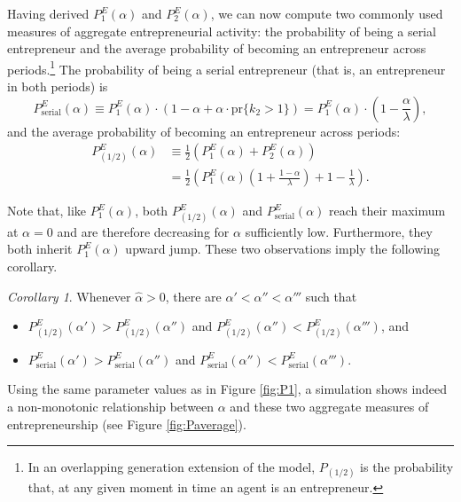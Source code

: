 \documentclass[12pt,american]{paper}
\theoremstyle{remark}
\newtheorem{cor}{Corollary}
\begin{document}
Having derived $P_1^E(\alpha)$ and $P_2^E(\alpha)$, we can now compute two commonly used measures of aggregate entrepreneurial activity: the probability of being a serial entrepreneur and the average probability of becoming an entrepreneur across periods.\footnote{In an overlapping generation extension of the model, $P_{(1/2)}$ is the probability that, at any given moment in time an agent is an entrepreneur.}
The probability of being a serial entrepreneur (that is, an entrepreneur in both periods) is
$$
P_{\mbox{serial}}^E(\alpha)\equiv P_1^E(\alpha) \cdot (1-\alpha +  \alpha \cdot \mbox{pr}\{k_2>1\})= P_1^E (\alpha)  \cdot \left(1-\frac{\alpha}{\lambda} \right),
$$
and the average probability of becoming an entrepreneur across periods:
\begin{align*}
P_{(1/2)}^E(\alpha)&\equiv \frac{1}{2} \left( P_1^E(\alpha) + P_2^E(\alpha) \right)\\
&= \frac{1}{2} \left( P_1^E(\alpha) \left(1+\frac{1-\alpha}{\lambda}\right) + 1 -\frac{1}{\lambda}  \right). 
\end{align*} 

Note that, like $ P_1^E(\alpha)$, both $P_{(1/2)}^E(\alpha)$ and $P_{\mbox{serial}}^E(\alpha)$ reach their maximum at $\alpha=0$ and are therefore decreasing for $\alpha$ sufficiently low. Furthermore, they both inherit $ P_1^E(\alpha)$ upward jump. These two observations imply the following corollary.


\begin{cor}\label{prop:probability-of-entrepreneurship}
Whenever $\hat \alpha > 0$, there are $\alpha'<\alpha''<\alpha'''$ such that
\begin{itemize}
    \item $P^E_{(1/2)}(\alpha')>P^E_{(1/2)}(\alpha'')$ and $P^E_{(1/2)}(\alpha'')<P^E_{(1/2)}(\alpha''')$, and
    \item $P^E_{\mbox{serial}}(\alpha')>P^E_{\mbox{serial}}(\alpha'')$ and $P^E_{\mbox{serial}}(\alpha'')<P^E_{\mbox{serial}}(\alpha''')$.
\end{itemize}


\end{cor}



Using the same parameter values as in Figure \ref{fig:P1}, a simulation shows indeed a non-monotonic relationship between $\alpha$ and these two aggregate measures of entrepreneurship (see Figure \ref{fig:Paverage}).
\end{document}
